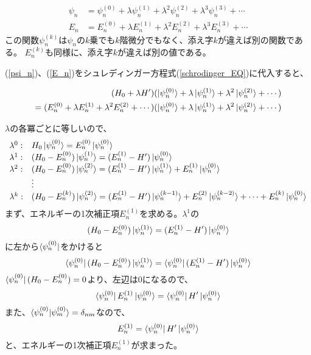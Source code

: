 \begin{align}
  \label{psi_n}
  \psi_{n} &= \psi_{n}^{(0)}+\lambda \psi_{n}^{(1)}+\lambda^{2}\psi_{n}^{(2)}+\lambda^{3} \psi_{n}^{(3)}+\cdots \\
  \label{E_n}
  E_{n} &= E_{n}^{(0)}+\lambda E_{n}^{(1)}+\lambda^{2} E_{n}^{(2)}+\lambda^{3} E_{n}^{(3)}+\cdots
\end{align}
この関数$\psi_n^{(k)}$は$\psi_n$の$k$乗でも$k$階微分でもなく、添え字$k$が違えば別の関数である。
$E_n^{(k)}$も同様に、添え字$k$が違えば別の値である。

(\ref{psi_n})、(\ref{E_n})をシュレディンガー方程式(\ref{schrodinger_EQ})に代入すると、

\begin{equation}
  \begin{split}
    (H_0 + \lambda H')(\ket{\psi_n^{(0)}} + \lambda\ket{\psi_n^{(1)}} + \lambda^2\ket{\psi_n^{(2)}} + \cdots)\\
    = (E_n^{(0)} + \lambda E_n^{(1)} + \lambda^2E_n^{(2)} + \cdots )(\ket{\psi_n^{(0)}} + \lambda \ket{\psi_n^{(1)}} + \lambda^2\ket{\psi_n^{(2)}} + \cdots)
  \end{split}
\end{equation}

$\lambda$の各冪ごとに等しいので、
\begin{equation}
  \begin{array}{ll}
    \lambda^0: & H_0\ket{\psi_n^{(0)}} = E_n^{(0)}\ket{\psi_n^{(0)}} \\
    \lambda^1: & (H_0 - E_n^{(0)})\ket{\psi_n^{(1)}} = (E_n^{(1)} - H')\ket{\psi_n^{(0)}} \\
    \lambda^2: & (H_0 - E_n^{(0)})\ket{\psi_n^{(2)}} = (E_n^{(1)} - H')\ket{\psi_n^{(1)}} + E_n^{(1)}\ket{\psi_n^{(0)}} \\
    & \vdots  \\
    \lambda^k: & (H_0 - E_n^{(k)})\ket{\psi_n^{(2)}} = (E_n^{(1)} - H')\ket{\psi_n^{(k-1)}} + E_n^{(2)}\ket{\psi_n^{(k-2)}} + \cdots + E_n^{(k)}\ket{\psi_n^{(0)}}
  \end{array}
\end{equation}
まず、エネルギーの1次補正項$E_n^{(1)}$を求める。$\lambda^1$の
\begin{equation}
  \label{lambda1}
  (H_0 - E_n^{(0)})\ket{\psi_n^{(1)}} = (E_n^{(1)} - H')\ket{\psi_n^{(0)}}
\end{equation}
に左から$\bra{\psi_n^{(0)}}$をかけると
\begin{equation}
  \bra{\psi_n^{(0)}}(H_0 - E_n^{(0)})\ket{\psi_n^{(1)}} = \bra{\psi_n^{(0)}}(E_n^{(1)} - H')\ket{\psi_n^{(0)}}
\end{equation}
$\bra{\psi_n^{(0)}}(H_0 - E_n^{(0)}) = 0$より、左辺は$0$になるので、
\begin{equation}
  \bra{\psi_n^{(0)}} E_n^{(1)} \ket{\psi_n^{(0)}} = \bra{\psi_n^{(0)}} H' \ket{\psi_n^{(0)}}
\end{equation}
また、$\braket{\psi_n^{(0)}|\psi_m^{(0)}} = \delta_{nm}$なので、
\begin{equation}
  \label{result_En}
  E_n^{(1)} = \bra{\psi_n^{(0)}} H' \ket{\psi_n^{(0)}}
\end{equation}
と、エネルギーの1次補正項$E_n^{(1)}$が求まった。

